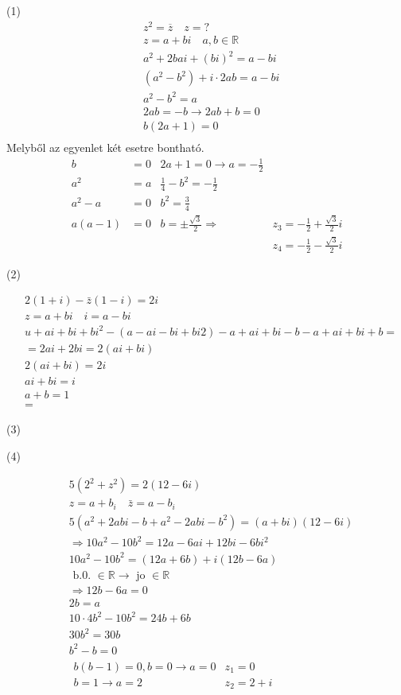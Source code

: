 (1)
\begin{align*}
&z^{2}=\overline{z} \quad z=? \\
&z=a+b i \quad a, b \in \mathbb{R} \\
&a^{2}+2 b a i+(b i)^{2}=a-b i \\
&\left(a^{2}-b^{2}\right)+i \cdot 2 a b=a-b i \\
&a^{2}-b^{2}=a \\
&2 a b=-b \rightarrow 2 a b+b=0 \\
&b(2 a+1)=0 \\
\end{align*}
Melyből az egyenlet két esetre bontható.
\begin{align*}
b&=0 &2 a+1=0 \rightarrow a=-\frac{1}{2}\\
a^{2}&=a &\frac{1}{4}-b^{2}=-\frac{1}{2} \\
a^{2}-a&=0 &b^{2}=\frac{3}{4}\\
a(a-1)&=0 &b=\pm \frac{\sqrt{3}}{2} \Longrightarrow &z_{3}=-\frac{1}{2}+\frac{\sqrt{3}}{2} i\\
&&& z_{4}=- \frac{1}{2} - \frac{\sqrt{3}}{2} i
\end{align*}


(2)

\[
\begin{aligned}
&2(1+i)-\bar{z}(1-i)=2 i \\
&z=a+b i \quad i=a-b i \\
&u+a i+b i+b i^{2}-(a-a i-b i+b i 2)-a+a i+b i-b-a+a i+b i+b= \\
&=2 a i+2 b i=2(a i+b i) \\
&2(a i+b i)=2 i \\
&a i+b i=i \\
&a+b=1 \\
&=
\end{aligned}
\]

(3)

(4)

\[
\begin{aligned}
& 5\left(2^{2}+z^{2}\right)=2(12-6 i) \\
& z=a+b_{i} \quad \bar{z}=a-b_{i} \\
& 5\left(a^{2}+2 a b i-b+a^{2}-2 a b i-b^{2}\right)=(a+b i)(12-6 i) \\
& \Rightarrow 10 a^{2}-10 b^{2}=12 a-6 a i+12 b i-6 b i^{2} \\
& 10 a^{2}-10 b^{2}=(12 a+6 b)+i(12 b-6 a) \\
& \text { b.0. } \in \mathbb{R} \rightarrow \text { jo } \in \mathbb{R} \\
& \Rightarrow 12 b-6 a=0 \\
& 2 b=a \\
& 10 \cdot 4 b^{2}-10 b^{2}=24 b+6 b \\
& 30 b^{2}=30 b \\
& b^{2}-b=0 \\
& \begin{array}{ll}b(b-1)=0, b=0 \rightarrow a=0 & z_{1}=0 \\b=1 \rightarrow a=2 & z_{2}=2+i\end{array}
\end{aligned}
\]

